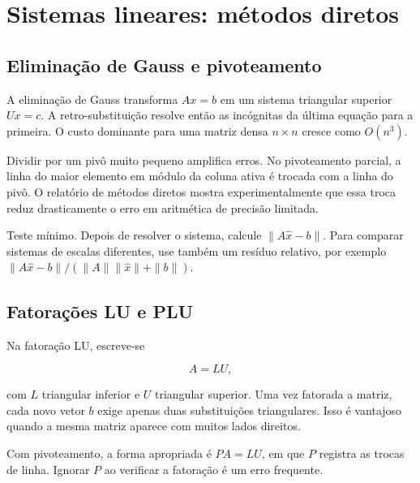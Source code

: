 \documentclass[12pt,a4paper,openany]{book}
\begin{document}
\chapter{Sistemas lineares: métodos diretos}



\section{Eliminação de Gauss e pivoteamento}



A eliminação de Gauss transforma $Ax=b$ em um sistema triangular superior $Ux=c$. A retro-substituição resolve então as incógnitas da última equação para a primeira. O custo dominante para uma matriz densa $n\times n$ cresce como $O(n^3)$.



Dividir por um pivô muito pequeno amplifica erros. No pivoteamento parcial, a linha do maior elemento em módulo da coluna ativa é trocada com a linha do pivô. O relatório de métodos diretos mostra experimentalmente que essa troca reduz drasticamente o erro em aritmética de precisão limitada.



\begin{destaque}{Teste mínimo.}
Depois de resolver o sistema, calcule $\|A\widehat{x}-b\|$. Para comparar sistemas de escalas diferentes, use também um resíduo relativo, por exemplo $\|A\widehat{x}-b\|/(\|A\|\|\widehat{x}\|+\|b\|)$.
\end{destaque}



\section{Fatorações LU e PLU}



Na fatoração LU, escreve-se



\[A=LU,\]



com $L$ triangular inferior e $U$ triangular superior. Uma vez fatorada a matriz, cada novo vetor $b$ exige apenas duas substituições triangulares. Isso é vantajoso quando a mesma matriz aparece com muitos lados direitos.



Com pivoteamento, a forma apropriada é $PA=LU$, em que $P$ registra as trocas de linha. Ignorar $P$ ao verificar a fatoração é um erro frequente.
\end{document}
